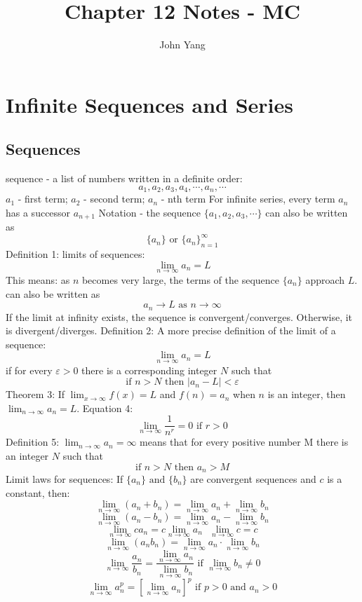 \documentclass{article}
\title{Chapter 12 Notes - MC} %
\author{John Yang}
\begin{document}
    \maketitle
    \tableofcontents
    \section{Infinite Sequences and Series} %
    \subsection{Sequences} %
    \begin{outline}
        \1 sequence - a list of numbers written in a definite order: \[a_1, a_2, a_3, a_4, \cdots, a_n, \cdots \]
        \1 $a_1$ - first term; $a_2$ - second term; $a_n$ - nth term 
        \1 For infinite series, every term $a_n$ has a successor $a_{n+1}$
        \1 Notation - the sequence \(\{a_1, a_2, a_3, \cdots\}\) can also be written as \[\{a_n\}\text{ or }\{a_n\}^\infty_{n=1}\] 
        \1 Definition 1: limits of sequences: \[\lim_{n\to\infty}a_n=L\]
            \2 This means: as $n$ becomes very large, the terms of the sequence $\{a_n\}$ approach $L$. 
        \1 can also be written as \[a_n\to L \text{ as } n\to\infty\]
        \1 If the limit at infinity exists, the sequence is convergent/converges. Otherwise, it is divergent/diverges. 
        \1 Definition 2: A more precise definition of the limit of a sequence: \[\lim_{n\to\infty}a_n=L\] if for every \(\varepsilon>0\) there is a corresponding integer $N$ such that \[\text{if }n>N\text{ then }|a_n-L|<\varepsilon\]
        \1 Theorem 3: If \(\lim_{x\to\infty}f(x)=L\) and \(f(n)=a_n\) when $n$ is an integer, then \(\lim_{n\to\infty}a_n=L\). 
        \1 Equation 4: \[\lim_{n\to\infty}\dfrac{1}{n^r}=0\text{    if }r>0\]
        \1 Definition 5: \(\lim_{n\to\infty}a_n=\infty\) means that for every positive number M there is an integer $N$ such that \[\text{if }n>N\text{ then }a_n>M\]
        \1 Limit laws for sequences: If \(\{a_n\}\text{ and }\{b_n\}\) are convergent sequences and $c$ is a constant, then: \[\lim_{n\to\infty}(a_n+b_n)=\lim_{n\to\infty}a_n+\lim_{n\to\infty}b_n\]\[\lim_{n\to\infty}(a_n-b_n)=\lim_{n\to\infty}a_n-\lim_{n\to\infty}b_n\]\[\lim_{n\to\infty}ca_n=c\lim_{n\to\infty}a_n\text{    }\lim_{n\to\infty}c=c\]\[\lim_{n\to\infty}(a_nb_n)=\lim_{n\to\infty}a_n\cdot\lim_{n\to\infty}b_n\]\[\lim_{n\to\infty}\dfrac{a_n}{b_n}=\dfrac{\lim_{n\to\infty}a_n}{\lim_{n\to\infty}b_n}\text{ if }\lim_{n\to\infty}b_n\neq0\]\[\lim_{n\to\infty}a_n^p=\left[\lim_{n\to\infty}a_n\right]^p\text{ if }p>0\text{ and }a_n>0\]

\end{outline}
\end{document}
